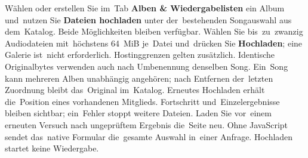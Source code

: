 \documentclass[11pt,a4paper]{article}
\newcommand{\ui}[1]{\textbf{#1}}
\begin{document}
Wählen oder erstellen Sie im~Tab \ui{Alben \& Wiedergabelisten} ein Album
und~nutzen Sie \ui{Dateien hochladen} unter der~bestehenden Songauswahl aus
dem~Katalog. Beide Möglichkeiten bleiben verfügbar. Wählen Sie bis~zu~zwanzig
Audiodateien mit~höchstens 64~MiB je~Datei und~drücken Sie \ui{Hochladen};
eine Galerie ist~nicht erforderlich. Hostinggrenzen gelten zusätzlich.
Identische Originalbytes verwenden auch nach Umbenennung denselben Song.
Ein~Song kann mehreren Alben unabhängig angehören; nach Entfernen der~letzten
Zuordnung bleibt das~Original im~Katalog. Erneutes Hochladen erhält die~Position
eines vorhandenen Mitglieds. Fortschritt und~Einzelergebnisse bleiben sichtbar;
ein~Fehler stoppt weitere Dateien. Laden Sie vor~einem erneuten Versuch nach
ungeprüftem Ergebnis die~Seite neu. Ohne JavaScript sendet das~native Formular
die~gesamte Auswahl in~einer Anfrage. Hochladen startet keine Wiedergabe.
\end{document}
